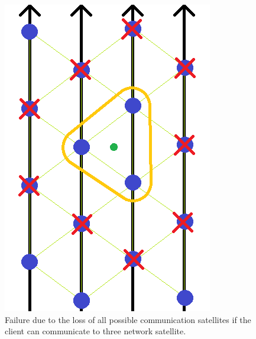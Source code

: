 \documentclass[12pt,a4paper]{report}
\begin{document}
\begin{figure}[H]
\begin{center}
\includegraphics[scale=0.5]{critical3.PNG}
\caption[3 communication range failure]{Failure due to the loss of all possible communication satellites if the client can communicate to three network satellite.}
\label{fig:critical3}
\end{center}
\end{figure}
\end{document}
